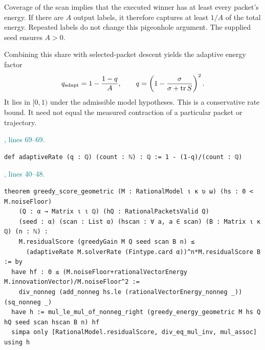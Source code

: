 \documentclass[11pt]{article}\usepackage{needspace}\renewcommand{\paperkind}{Lean companion}\setlength{\parskip}{0.35em}
\begin{document}
Coverage of the scan implies that the executed winner has at least every packet's energy. If there are $A$ output labels, it therefore captures at least $1/A$ of the total energy. Repeated labels do not change this pigeonhole argument. The supplied seed ensures $A>0$.

Combining this share with selected-packet descent yields the adaptive energy factor
\[
 q_{\rm adapt}=1-\frac{1-q}{A},\qquad
 q=\left(1-\frac{\sigma}{\sigma+\operatorname{tr} S}\right)^2.
\]
It lies in $[0,1)$ under the admissible model hypotheses. This is a conservative rate bound. It need not equal the measured contraction of a particular packet or trajectory.



{\small\textcolor{teal}{, lines 69--69.}\par}

\begin{lstlisting}[style=BayesSource]
def adaptiveRate (q : ℚ) (count : ℕ) : ℚ := 1 - (1-q)/(count : ℚ)
\end{lstlisting}



{\small\textcolor{teal}{, lines 40--48.}\par}

\begin{lstlisting}[style=BayesSource]
theorem greedy_score_geometric (M : RationalModel ι κ υ ω) (hs : 0 < M.noiseFloor)
    (Q : α → Matrix ι ι ℚ) (hQ : RationalPacketsValid Q)
    (seed : α) (scan : List α) (hscan : ∀ a, a ∈ scan) (B : Matrix ι κ ℚ) (n : ℕ) :
    M.residualScore (greedyGain M Q seed scan B n) ≤
      (adaptiveRate M.solverRate (Fintype.card α))^n*M.residualScore B := by
  have hf : 0 ≤ (M.noiseFloor+rationalVectorEnergy M.innovationVector)/M.noiseFloor^2 :=
    div_nonneg (add_nonneg hs.le (rationalVectorEnergy_nonneg _)) (sq_nonneg _)
  have h := mul_le_mul_of_nonneg_right (greedy_energy_geometric M hs Q hQ seed scan hscan B n) hf
  simpa only [RationalModel.residualScore, div_eq_mul_inv, mul_assoc] using h
\end{lstlisting}
\end{document}
